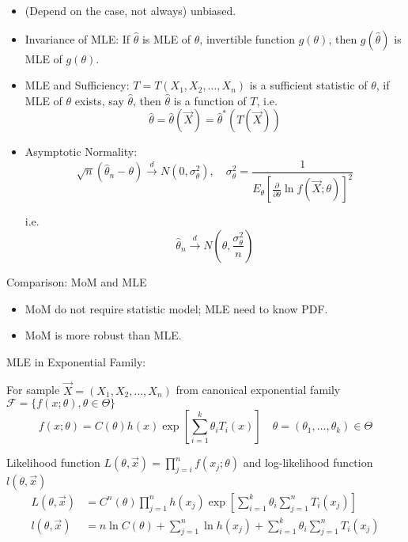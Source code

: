         
    \begin{itemize}
        \item (Depend on the case, not always) unbiased.
        \item Invariance of MLE: If $\hat{\theta}$ is MLE of $\theta$, invertible function $g(\theta)$, then $g(\hat{\theta})$ is MLE of $g(\theta)$.
        \item MLE and Sufficiency: $T=T(X_1,X_2,\ldots,X_n)$ is a sufficient statistic of $\theta$, if MLE of $\theta$ exists, say $\hat{\theta}$, then $\hat{\theta}$ is a function of $T$, i.e.
        \[  
            \hat{\theta}=\hat{\theta}(\vec{X})=\hat{\theta}^*(T(\vec{X}))    
        \]
        \item Asymptotic Normality: 
        \[
            \sqrt{n}(\hat{\theta}_n-\theta) \xrightarrow[]{d}N(0,\sigma^2_\theta),\quad \sigma^2_\theta=\frac{1}{E_\theta[\frac{\partial}{\partial\theta}\ln f(\vec{X};\theta)]^2}   
        \]

        i.e.
        \[
            \hat{\theta}_n\xrightarrow[]{d}N(\theta,\frac{\sigma^2_\theta}{n})    
        \]
        
    \end{itemize}

    \begin{point}
        Comparison: MoM and MLE
    \end{point}
    
        
    \begin{itemize}
        \item MoM do not require statistic model; MLE need to know PDF.
        \item MoM is more robust than MLE.
    \end{itemize}


    MLE in Exponential Family:

        For sample $\vec{X}=(X_1,X_2,\ldots,X_n)$ from canonical exponential family $\mathscr{F}=\{f(x;\theta),\theta\in\Theta\}$
        \[
            f(x;\theta)=C(\theta)h(x)\exp\left[\sum_{i=1}^k\theta_iT_i(x)\right]\quad \theta=(\theta_1,\ldots,\theta_k)\in\Theta
        \]

        Likelihood function $L(\theta,\vec{x})=\prod_{j=i}^nf(x_j;\theta)$ and log-likelihood function $l(\theta,\vec{x})$
        \begin{align*}
            L(\theta,\vec{x})&=C^n(\theta)\prod_{j=1}^nh(x_j)\exp\left[\sum_{i=1}^k\theta_i\sum_{j=1}^n T_i(x_j)\right]\\
            l(\theta,\vec{x})&=n\ln C(\theta)+\sum_{j=1}^n\ln h(x_j)+\sum_{i=1}^k\theta_i\sum_{j=1}^nT_i(x_j)
        \end{align*}

